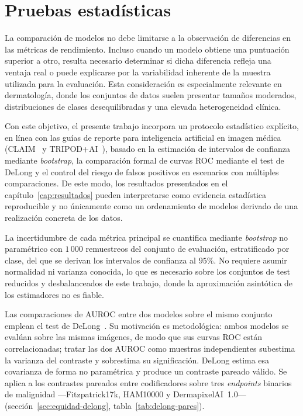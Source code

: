 \section{Pruebas estadísticas}
\label{sec:estadistica}

La comparación de modelos no debe limitarse a la observación de
diferencias en las métricas de rendimiento. Incluso cuando un modelo
obtiene una puntuación superior a otro, resulta necesario determinar
si dicha diferencia refleja una ventaja real o puede explicarse por
la variabilidad inherente de la muestra utilizada para la
evaluación. Esta consideración es especialmente relevante en
dermatología, donde los conjuntos de datos suelen presentar tamaños
moderados, distribuciones de clases desequilibradas y una elevada
heterogeneidad clínica.

Con este objetivo, el presente trabajo incorpora un protocolo
estadístico explícito, en línea con las guías de reporte para
inteligencia artificial en imagen médica (CLAIM~\cite{claim2024} y
TRIPOD+AI~\cite{tripodai2024}), basado en la estimación de
intervalos de confianza mediante \emph{bootstrap}, la comparación
formal de curvas ROC mediante el test de DeLong y el control del
riesgo de falsos positivos en escenarios con múltiples
comparaciones. De este modo, los resultados presentados en el
capítulo~\ref{cap:resultados} pueden interpretarse como evidencia
estadística reproducible y no únicamente como un ordenamiento de
modelos derivado de una realización concreta de los datos.

La incertidumbre de cada métrica principal se cuantifica mediante
\emph{bootstrap} no paramétrico con $1\,000$ remuestreos del
conjunto de evaluación, estratificado por clase, del que se derivan
los intervalos de confianza al $95\%$. No requiere asumir
normalidad ni varianza conocida, lo que es necesario sobre los
conjuntos de test reducidos y desbalanceados de este trabajo, donde
la aproximación asintótica de los estimadores no es fiable.

Las comparaciones de AUROC entre dos modelos sobre el mismo conjunto
emplean el test de DeLong~\cite{delong1988}. Su motivación es
metodológica: ambos modelos se evalúan sobre las mismas imágenes, de
modo que sus curvas ROC están correlacionadas; tratar las dos AUROC
como muestras independientes subestima la varianza del contraste y
sobrestima su significación. DeLong estima esa covarianza de forma
no paramétrica y produce un contraste pareado válido. Se aplica a los
contrastes pareados entre codificadores sobre tres \emph{endpoints}
binarios de malignidad ---Fitzpatrick17k, HAM10000 y DermapixelAI~1.0---
(sección~\ref{sec:equidad-delong}, tabla~\ref{tab:delong-pares}).

